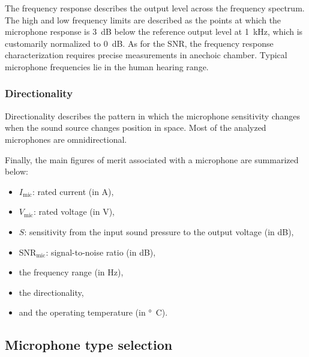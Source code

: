 \documentclass{EPL-master-thesis-covers-EN}
\newcommand{\te}[1]{\textrm{#1}}
\begin{document}
The frequency response describes the output level across the frequency spectrum. The high and low frequency limits are described as the points at which the microphone response is \SI{3}{dB} below the reference output level at \SI{1}{kHz}, which is customarily normalized to \SI{0}{dB}. As for the SNR, the frequency response characterization requires precise measurements in anechoic chamber. Typical microphone frequencies lie in the human hearing range.

\subsubsection*{Directionality}

Directionality describes the pattern in which the microphone sensitivity changes when the sound source changes position in space. Most of the analyzed microphones are omnidirectional.

Finally, the main figures of merit associated with a microphone are summarized below:

\begin{itemize}
 \item $I_{\te{mic}}$: rated current (in A),
 \item $V_{\te{mic}}$: rated voltage (in V),
 \item $S$: sensitivity from the input sound pressure to the output voltage (in dB),
 \item $\te{SNR}_{\te{mic}}$: signal-to-noise ratio (in dB),
 \item the frequency range (in Hz),
 \item the directionality,
 \item and the operating temperature (in \si{\degree C}).
\end{itemize}


\subsection*{Microphone type selection}
\end{document}
